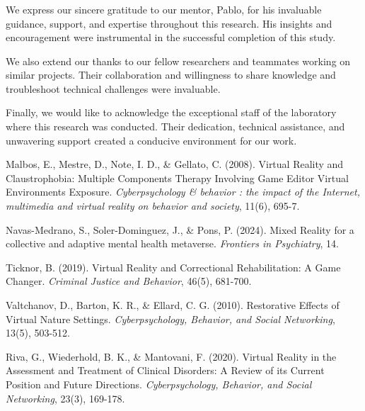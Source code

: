\documentclass[runningheads]{llncs}
\begin{document}
\begin{credits}
\subsubsection{\ackname} We express our sincere gratitude to our mentor, Pablo, for his invaluable guidance, support, and expertise throughout this research. His insights and encouragement were instrumental in the successful completion of this study.

We also extend our thanks to our fellow researchers and teammates working on similar projects. Their collaboration and willingness to share knowledge and troubleshoot technical challenges were invaluable.

Finally, we would like to acknowledge the exceptional staff of the laboratory where this research was conducted. Their dedication, technical assistance, and unwavering support created a conducive environment for our work.


\end{credits}
%
%
%
% 
% 
%

\begin{thebibliography}{8}
Malbos, E., Mestre, D., Note, I. D., \& Gellato, C. (2008). Virtual Reality and Claustrophobia: Multiple Components Therapy Involving Game Editor Virtual Environments Exposure. \textit{Cyberpsychology \& behavior : the impact of the Internet, multimedia and virtual reality on behavior and society}, 11(6), 695-7.

Navas-Medrano, S., Soler-Dominguez, J., \& Pons, P. (2024). Mixed Reality for a collective and adaptive mental health metaverse. \textit{Frontiers in Psychiatry}, 14.

Ticknor, B. (2019). Virtual Reality and Correctional Rehabilitation: A Game Changer. \textit{Criminal Justice and Behavior}, 46(5), 681-700.

Valtchanov, D., Barton, K. R., \& Ellard, C. G. (2010). Restorative Effects of Virtual Nature Settings. \textit{Cyberpsychology, Behavior, and Social Networking}, 13(5), 503-512.

Riva, G., Wiederhold, B. K., \& Mantovani, F. (2020). Virtual Reality in the Assessment and Treatment of Clinical Disorders: A Review of its Current Position and Future Directions. \textit{Cyberpsychology, Behavior, and Social Networking}, 23(3), 169-178.
\end{thebibliography}
\end{document}
